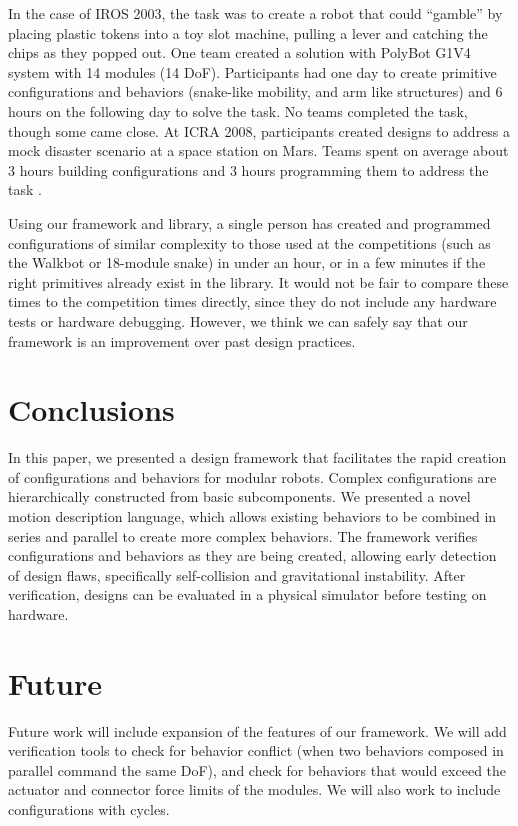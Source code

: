 \documentclass[conference]{IEEEtran}
\theoremstyle{definition}
\begin{document}
In the case of IROS 2003, the task was to create a robot that could ``gamble'' by placing plastic tokens into a toy slot machine, pulling a lever and catching the chips as they popped out.  One team created a solution with PolyBot G1V4 system with 14 modules (14 DoF). Participants
had one day to create primitive configurations and behaviors (snake-like mobility, and arm like structures) and
 6 hours on the following day to solve the task. No teams completed the task, though
some came close. 
At ICRA 2008, participants created designs to address a mock disaster scenario
at a space station on Mars. Teams spent on average about 3 hours building configurations and
3 hours programming them to address the task \cite{sastra2011using}.  
  
Using our framework and library, a single person has created and programmed   configurations of similar complexity to those used at
the competitions (such as the Walkbot or 18-module snake)
in under an hour,
or in a few minutes if the right primitives already exist in the library. It would
not be fair to compare these times to the competition times directly, since they do not include any
hardware tests or hardware debugging. However, we think we can safely say that
our framework is an improvement over past design practices.

\section{Conclusions}
In this paper, we presented a design framework that facilitates the rapid creation
of configurations and behaviors for modular robots.
Complex configurations  are hierarchically constructed from basic
subcomponents.
We presented a novel motion description language, which allows existing behaviors
to be combined in series and parallel  to create more complex  behaviors.
The framework verifies  configurations and behaviors as they are being created, allowing
early detection of  design flaws, specifically self-collision and gravitational instability. After
verification, designs can be evaluated in a physical simulator before testing on
hardware.

\section{Future}
Future work will include expansion of the features of our framework.  We will add verification tools to check for behavior conflict (when two behaviors composed in parallel command the same DoF), and check for behaviors that would exceed the actuator and connector force limits of the modules.  We will also work to include configurations with cycles.
\end{document}
